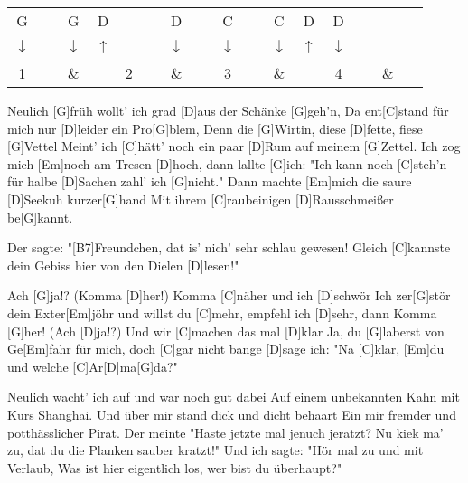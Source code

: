 

\begin{guitar}
	\newcommand{\up}{$\uparrow$}%
	\newcommand{\down}{$\downarrow$}%
	{\footnotesize \setlength{\tabcolsep}{3pt} \begin{tabular}{|cccc|cccc|cccc|cccc|}
			G & ~ & G & D & ~ & ~ & D & ~ & C & ~ & C & D & D & ~ & ~ & ~ \\
			\down & ~ & \down & \up & ~ & ~ & \down & ~ & \down & ~ & \down & \up & \down & ~ & ~ & ~ \\
			1 & ~ & \& & ~ & 2 & ~ & \& & ~ & 3 & ~ & \& & ~ & 4 & ~ & \& & ~ 
	\end{tabular}} 
	
	Neulich [G]früh wollt' ich grad [D]aus der Schänke [G]geh'n,
	Da ent[C]stand für mich nur [D]leider ein Pro[G]blem,
	Denn die [G]Wirtin, diese [D]fette, fiese [G]Vettel
	Meint' ich [C]hätt' noch ein paar [D]Rum auf meinem [G]Zettel.
	Ich zog mich [Em]noch am Tresen [D]hoch, dann lallte [G]ich:
	"Ich kann noch [C]steh'n für halbe [D]Sachen zahl' ich [G]nicht."
	Dann machte [Em]mich die saure [D]Seekuh kurzer[G]hand
	Mit ihrem [C]raubeinigen [D]Rausschmeißer be[G]kannt.

	Der sagte: "[B7]Freundchen, dat is' nich' sehr schlau gewesen!
	Gleich [C]kannste dein Gebiss hier von den Dielen [D]lesen!"
	
	\begin{highlightbar}
		Ach [G]ja!? (Komma [D]her!) Komma [C]näher und ich [D]schwör
		Ich zer[G]stör dein Exter[Em]jöhr und willst du [C]mehr, empfehl ich [D]sehr, dann
		Komma [G]her! (Ach [D]ja!?) Und wir [C]machen das mal [D]klar
		Ja, du [G]laberst von Ge[Em]fahr für mich, doch [C]gar nicht bange [D]sage ich:
		"Na [C]klar, [Em]du und welche [C]Ar[D]ma[G]da?"
	\end{highlightbar}
	
	Neulich wacht' ich auf und war noch gut dabei
	Auf einem unbekannten Kahn mit Kurs Shanghai.
	Und über mir stand dick und dicht behaart
	Ein mir fremder und potthässlicher Pirat.
	Der meinte "Haste jetzte mal jenuch jeratzt?
	Nu kiek ma' zu, dat du die Planken sauber kratzt!"
	Und ich sagte: "Hör mal zu und mit Verlaub,
	Was ist hier eigentlich los, wer bist du überhaupt?"
	

\end{guitar}
